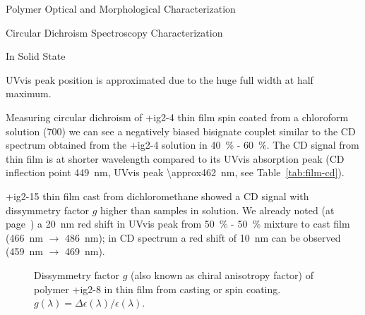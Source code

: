 \begin{section}{Polymer Optical and Morphological Characterization}
\begin{subsection}{Circular Dichroism Spectroscopy Characterization}
\begin{subsubsection}{In Solid State}
\begin{table}[tbp]
\smallskip

{\gls{UVvis} peak position is approximated due to the huge full width at half maximum.}

\end{table}

Measuring circular dichroism of \cmpd+{ig2-4} thin film spin coated from a chloroform solution (\SI{700}{\rpm}) we can see a negatively biased bisignate couplet similar to the \gls{CD} spectrum obtained from the \cmpd+{ig2-4} solution in  40~\% -  60~\%. 
The \gls{CD} signal from thin film is at shorter wavelength compared to its \gls{UVvis} absorption peak (\gls{CD} inflection point \SI{449}{\nm}, \gls{UVvis} peak \SI{\approx462}{\nm}, see Table~\ref{tab:film-cd}).

\cmpd+{ig2-15} thin film cast from dichloromethane showed a \gls{CD} signal with dissymmetry factor $g$ higher than samples in solution. We already noted (at page~\pageref{ig2-15-uvvis-film}) a \SI{20}{\nm} red shift in \gls{UVvis} peak from  50~\% -  50~\% mixture to cast film (\SI{466}{\nm} $\rightarrow$ \SI{486}{\nm}); in \gls{CD} spectrum a red shift of \SI{10}{\nm} can be observed (\SI{459}{\nm} $\rightarrow$ \SI{469}{\nm}).

\begin{figure}[tbp]%
 \caption[Dissymmetry factor of \cmpd+{ig2-8} in thin films.]{Dissymmetry factor $g$ (also known as chiral anisotropy factor) of polymer \cmpd+{ig2-8} in thin film from casting or spin coating. $g(\lambda) = \Delta\epsilon(\lambda) / \epsilon(\lambda)$.}
\label{fig:ig2-8-cd-film}
\end{figure}


\end{subsubsection}
\end{subsection}
\end{section}
